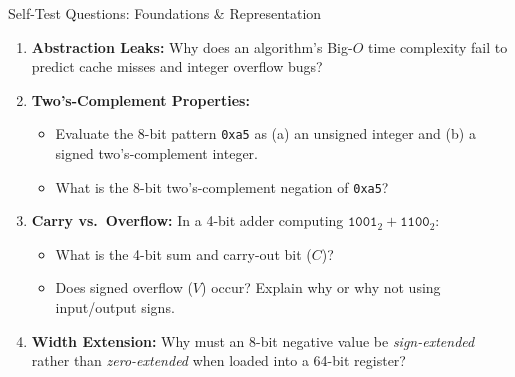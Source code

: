 \documentclass[aspectratio=169,11pt]{beamer}
\newcommand{\key}[1]{\textbf{#1}}
\newcommand{\bits}[1]{\texttt{#1}}
\newcommand{\hex}[1]{\texttt{0x#1}}
\begin{document}
\begin{frame}{Self-Test Questions: Foundations \& Representation}

\begin{enumerate}\setlength{\itemsep}{8pt}
  \item \key{Abstraction Leaks:} Why does an algorithm's Big-$O$ time complexity fail to predict cache misses and integer overflow bugs?
  
  \item \key{Two's-Complement Properties:} 
  \begin{itemize}
    \item Evaluate the 8-bit pattern \hex{a5} as (a) an unsigned integer and (b) a signed two's-complement integer.
    \item What is the 8-bit two's-complement negation of \hex{a5}?
  \end{itemize}

  \item \key{Carry vs.\ Overflow:} In a 4-bit adder computing $\bits{1001}_2 + \bits{1100}_2$:
  \begin{itemize}
    \item What is the 4-bit sum and carry-out bit ($C$)?
    \item Does signed overflow ($V$) occur? Explain why or why not using input/output signs.
  \end{itemize}

  \item \key{Width Extension:} Why must an 8-bit negative value be \emph{sign-extended} rather than \emph{zero-extended} when loaded into a 64-bit register?
\end{enumerate}

\end{frame}

\end{document}
